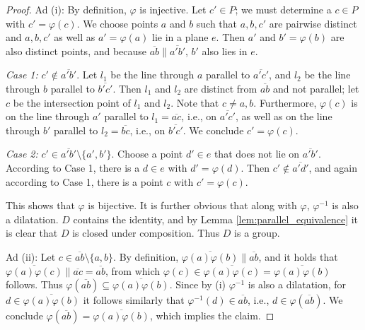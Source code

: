 \documentclass[11pt,a4paper]{article}
\newcommand{\lineab}[1]{\overline{#1}}
\begin{document}
\begin{proof}
Ad (i): By definition, $\varphi$ is injective. Let $c' \in P$; we must determine a $c \in P$ with $c' = \varphi(c)$. We choose points $a$ and $b$ such that $a, b, c'$ are pairwise distinct and $a, b, c'$ as well as $a' = \varphi(a)$ lie in a plane $e$. Then $a'$ and $b' = \varphi(b)$ are also distinct points, and because $\lineab{ab} \parallel \lineab{a'b'}$, $b'$ also lies in $e$.

\textit{Case 1:} $c' \notin \lineab{a'b'}$. Let $l_1$ be the line through $a$ parallel to $\lineab{a'c'}$, and $l_2$ be the line through $b$ parallel to $\lineab{b'c'}$. Then $l_1$ and $l_2$ are distinct from $\lineab{ab}$ and not parallel; let $c$ be the intersection point of $l_1$ and $l_2$. Note that $c \neq a, b$. Furthermore, $\varphi(c)$ is on the line through $a'$ parallel to $l_1 = \lineab{ac}$, i.e., on $\lineab{a'c'}$, as well as on the line through $b'$ parallel to $l_2 = \lineab{bc}$, i.e., on $\lineab{b'c'}$. We conclude $c' = \varphi(c)$.

\textit{Case 2:} $c' \in \lineab{a'b'} \setminus \{a', b'\}$. Choose a point $d' \in e$ that does not lie on $\lineab{a'b'}$. According to Case 1, there is a $d \in e$ with $d' = \varphi(d)$. Then $c' \notin \lineab{a'd'}$, and again according to Case 1, there is a point $c$ with $c' = \varphi(c)$.

This shows that $\varphi$ is bijective. It is further obvious that along with $\varphi$, $\varphi^{-1}$ is also a dilatation. $D$ contains the identity, and by Lemma \ref{lem:parallel_equivalence} it is clear that $D$ is closed under composition. Thus $D$ is a group.

Ad (ii): Let $c \in \lineab{ab} \setminus \{a, b\}$. By definition, $\lineab{\varphi(a)\varphi(b)} \parallel \lineab{ab}$, and it holds that $\lineab{\varphi(a)\varphi(c)} \parallel \lineab{ac} = \lineab{ab}$, from which $\varphi(c) \in \lineab{\varphi(a)\varphi(c)} = \lineab{\varphi(a)\varphi(b)}$ follows. Thus $\varphi(\lineab{ab}) \subseteq \lineab{\varphi(a)\varphi(b)}$. Since by (i) $\varphi^{-1}$ is also a dilatation, for $d \in \lineab{\varphi(a)\varphi(b)}$ it follows similarly that $\varphi^{-1}(d) \in \lineab{ab}$, i.e., $d \in \varphi(\lineab{ab})$. We conclude $\varphi(\lineab{ab}) = \lineab{\varphi(a)\varphi(b)}$, which implies the claim.


\end{proof}
\end{document}
